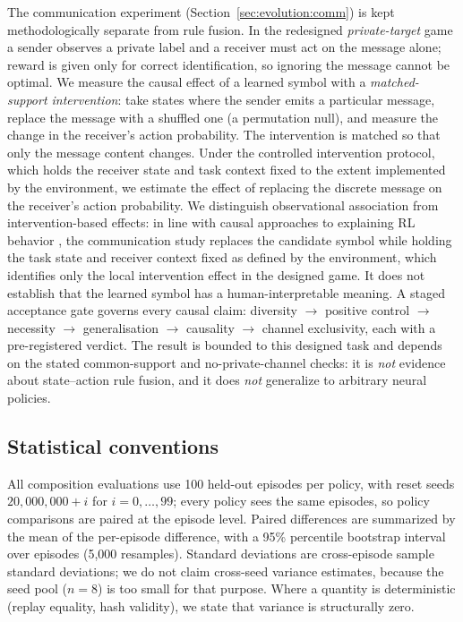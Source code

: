 \documentclass[11pt]{article}
\begin{document}
The communication experiment (Section~\ref{sec:evolution:comm}) is kept methodologically separate from
rule fusion. In the redesigned \emph{private-target} game a sender observes a private label and a
receiver must act on the message alone; reward is given only for correct identification, so ignoring
the message cannot be optimal. We measure the causal effect of a learned symbol with a
\emph{matched-support intervention}: take states where the sender emits a particular message, replace
the message with a shuffled one (a permutation null), and measure the change in the receiver's action
probability. The intervention is matched so that only the message content changes. Under the controlled
intervention protocol, which holds the receiver state and task context fixed to the extent implemented
by the environment, we estimate the effect of replacing the discrete message on the receiver's action
probability. We distinguish observational association from intervention-based effects: in line with
causal approaches to explaining RL behavior \cite{madumal2020explainable}, the communication study
replaces the candidate symbol while holding the task state and receiver context fixed as defined by the
environment, which identifies only the local intervention effect in the designed game. It does not
establish that the learned symbol has a human-interpretable meaning. A staged acceptance gate governs
every causal claim: diversity $\rightarrow$ positive control $\rightarrow$ necessity $\rightarrow$
generalisation $\rightarrow$ causality $\rightarrow$ channel exclusivity, each with a pre-registered
verdict. The result is bounded to this designed task and depends on the stated common-support and
no-private-channel checks: it is \emph{not} evidence about state--action
rule fusion, and it does \emph{not} generalize to arbitrary neural policies.

\subsection{Statistical conventions}
\label{sec:method:stats}

All composition evaluations use 100 held-out episodes per policy, with reset seeds
$20{,}000{,}000 + i$ for $i=0,\ldots,99$; every policy sees the same episodes, so policy comparisons
are paired at the episode level. Paired differences are summarized by the mean of the per-episode
difference, with a 95\% percentile bootstrap interval over episodes (5{,}000 resamples). Standard
deviations are cross-episode sample standard deviations; we do not claim cross-seed variance
estimates, because the seed pool ($n=8$) is too small for that purpose. Where a quantity is
deterministic (replay equality, hash validity), we state that variance is structurally zero.
\end{document}
